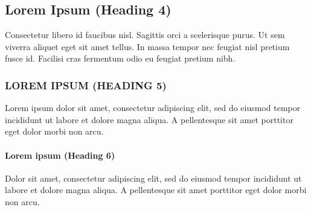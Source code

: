 \documentclass{nyu22report}
\begin{document}
\subsection{Lorem Ipsum (Heading 4)}

Consectetur libero id faucibus nisl. Sagittis orci a scelerisque purus. Ut sem
viverra aliquet eget sit amet tellus. In massa tempor nec feugiat nisl pretium
fusce id. Facilisi cras fermentum odio eu feugiat pretium nibh.

\subsubsection{LOREM IPSUM (HEADING 5)}

Lorem ipsum dolor sit amet, consectetur adipiscing elit, sed do eiusmod tempor
incididunt ut labore et dolore magna aliqua. A pellentesque sit amet porttitor
eget dolor morbi non arcu.

\paragraph{Lorem ipsum (Heading 6)}

Dolor sit amet, consectetur adipiscing elit, sed do eiusmod tempor incididunt ut
labore et dolore magna aliqua. A pellentesque sit amet porttitor eget dolor
morbi non arcu.
\end{document}
